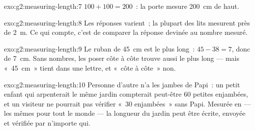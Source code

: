 \begin{solution}{exo:g2:measuring-length:7}
$100 + 100 = 200$~: la porte mesure \qty{200}{cm} de haut.
\end{solution}

\begin{solution}{exo:g2:measuring-length:8}
Les réponses varient~; la plupart des lits mesurent près de
\qty{2}{m}. Ce qui compte, c'est de comparer la réponse devinée au
nombre mesuré.
\end{solution}

\begin{solution}{exo:g2:measuring-length:9}
Le ruban de \qty{45}{cm} est le plus long~: $45 - 38 = 7$, donc de
\qty{7}{cm}. Sans nombres, les poser côte à côte trouve aussi le plus
long --- mais «~\qty{45}{cm}~» tient dans une lettre, et «~côte à
côte~» non.
\end{solution}

\begin{solution}{exo:g2:measuring-length:10}
Personne d'autre n'a les jambes de Papi~: un petit enfant qui
arpenterait le même jardin compterait peut-être $60$ petites
enjambées, et un visiteur ne pourrait pas vérifier «~$30$
enjambées~» sans Papi. Mesurée en  --- les mêmes pour tout le
monde --- la longueur du jardin peut être écrite, envoyée et vérifiée
par n'importe qui.
\end{solution}
